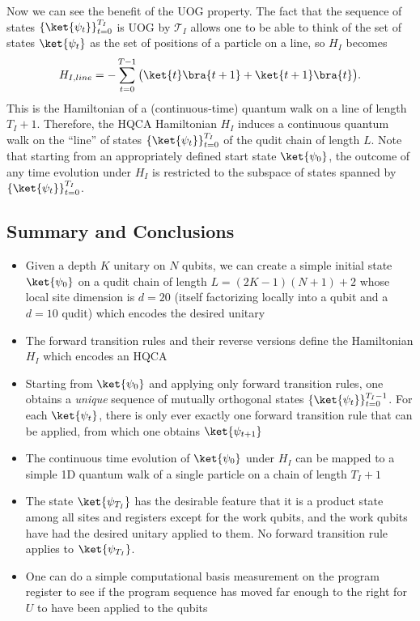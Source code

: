 \documentclass[11pt,letterpaper]{article}
\newcommand{\<}{\langle}
\renewcommand{\>}{\rangle}
\begin{document}
Now we can see the benefit of the UOG property. The fact that the sequence of states $\left\{\ket{\psi_t}\right\}_{t=0}^{T_I}$ is UOG by $\mathcal{T}_{I}$ allows one to be able to think of the set of states $\ket{\psi_t}$ as the set of positions of a particle on a line, so $H_I$  becomes 
\begin{eqnarray}
	H_{I,line} = - \sum_{t=0}^{T-1} \big(
		\ket{t}\bra{t+1} + \ket{t+1}\bra{t} 
			\big).
	\label{Hwalk}
\end{eqnarray}
This is the Hamiltonian of a (continuous-time) quantum walk on a line of length $T_I+1$. Therefore, the HQCA Hamiltonian $H_I$ induces a continuous quantum walk on the ``line'' of states $\left\{\ket{\psi_{t}}\right\}_{t=0}^{T_I}$ of the qudit chain of length $L$. Note that starting from an appropriately defined start state $\ket{\psi_0}$, the outcome of any time evolution under $H_I$ is restricted to the subspace of states spanned by $\left\{\ket{\psi_{t}}\right\}_{t=0}^{T_I}$.
\subsection{Summary and Conclusions}
\begin{itemize}
	\item Given a depth $K$ unitary on $N$ qubits, we can create a simple initial state $\ket{\psi_0}$ on a qudit chain of length $L=(2K-1)(N+1)+2$ whose local site dimension is $d=20$ (itself factorizing locally into a qubit and a $d=10$ qudit) which encodes the desired unitary
	\item The forward transition rules and their reverse versions define the Hamiltonian $H_{I}$ which encodes an HQCA
	\item Starting from $\ket{\psi_0}$ and applying only forward transition rules, one obtains a \emph{unique} sequence of mutually orthogonal states $\{\ket{\psi_t}\}_{t=0}^{T_I-1}$. For each $\ket{\psi_t}$, there is only ever exactly one forward transition rule that can be applied, from which one obtains $\ket{\psi_{t+1}}$
	\item The continuous time evolution of $\ket{\psi_0}$ under $H_{I}$ can be mapped to a simple 1D quantum walk of a single particle on a chain of length $T_I+1$
	\item The state $\ket{\psi_{T_I}}$ has the desirable feature that it is a product state among all sites and registers except for the work qubits, and the work qubits have had the desired unitary applied to them. No forward transition rule applies to $\ket{\psi_{T_I}}$.
	\item One can do a simple computational basis measurement on the program register to see if the program sequence has moved far enough to the right for $U$ to have been applied to the qubits
\end{itemize}
\end{document}
